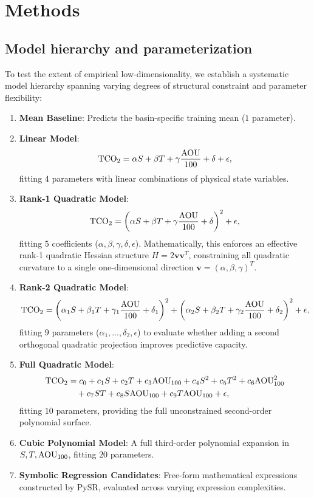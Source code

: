 \section{Methods}

\subsection{Model hierarchy and parameterization}
To test the extent of empirical low-dimensionality, we establish a systematic model hierarchy spanning varying degrees of structural constraint and parameter flexibility:
\begin{enumerate}[label=\arabic*.]
\item \textbf{Mean Baseline}: Predicts the basin-specific training mean ($1$ parameter).
\item \textbf{Linear Model}:
\begin{equation}
\mathrm{TCO_2} = \alpha S + \beta T + \gamma \frac{\mathrm{AOU}}{100} + \delta + \epsilon,
\end{equation}
fitting $4$ parameters with linear combinations of physical state variables.
\item \textbf{Rank-1 Quadratic Model}:
\begin{equation}
\mathrm{TCO_2} = \left( \alpha S + \beta T + \gamma \frac{\mathrm{AOU}}{100} + \delta \right)^2 + \epsilon,
\end{equation}
fitting $5$ coefficients ($\alpha, \beta, \gamma, \delta, \epsilon$). Mathematically, this enforces an effective rank-1 quadratic Hessian structure $H = 2 \mathbf{v}\mathbf{v}^T$, constraining all quadratic curvature to a single one-dimensional direction $\mathbf{v} = (\alpha, \beta, \gamma)^T$.
\item \textbf{Rank-2 Quadratic Model}:
\begin{equation}
\mathrm{TCO_2} = \left( \alpha_1 S + \beta_1 T + \gamma_1 \frac{\mathrm{AOU}}{100} + \delta_1 \right)^2 + \left( \alpha_2 S + \beta_2 T + \gamma_2 \frac{\mathrm{AOU}}{100} + \delta_2 \right)^2 + \epsilon,
\end{equation}
fitting $9$ parameters ($\alpha_1,\dots,\delta_2, \epsilon$) to evaluate whether adding a second orthogonal quadratic projection improves predictive capacity.
\item \textbf{Full Quadratic Model}:
\begin{align}
\mathrm{TCO_2} &= c_0 + c_1 S + c_2 T + c_3 \mathrm{AOU}_{100} + c_4 S^2 + c_5 T^2 + c_6 \mathrm{AOU}_{100}^2 \nonumber \\
&\quad + c_7 ST + c_8 S\mathrm{AOU}_{100} + c_9 T\mathrm{AOU}_{100} + \epsilon,
\end{align}
fitting $10$ parameters, providing the full unconstrained second-order polynomial surface.
\item \textbf{Cubic Polynomial Model}: A full third-order polynomial expansion in $S, T, \mathrm{AOU}_{100}$, fitting $20$ parameters.
\item \textbf{Symbolic Regression Candidates}: Free-form mathematical expressions constructed by PySR, evaluated across varying expression complexities.
\end{enumerate}

